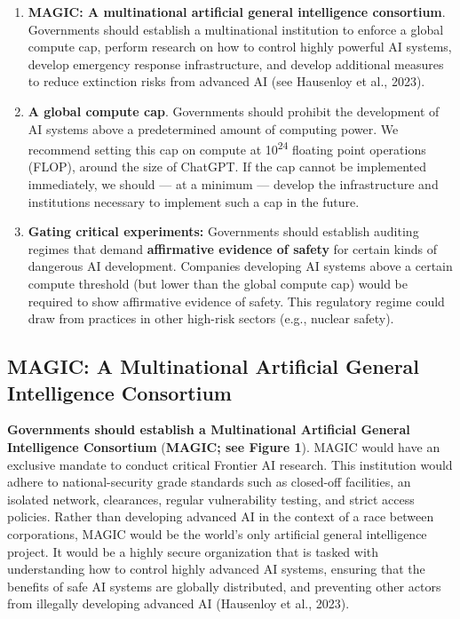 \documentclass[12pt,a4paper]{article}
\begin{document}
\begin{enumerate}
\item \textbf{MAGIC: A multinational artificial general intelligence consortium}. Governments should establish a multinational institution to enforce a global compute cap, perform research on how to control highly powerful AI systems, develop emergency response infrastructure, and develop additional measures to reduce extinction risks from advanced AI (see Hausenloy et al., 2023). 
\item \textbf{A global compute cap}. Governments should prohibit the development of AI systems above a predetermined amount of computing power. We recommend setting this cap on compute at 10\textsuperscript{24} floating point operations (FLOP), around the size of ChatGPT. If the cap cannot be implemented immediately, we should — at a minimum — develop the infrastructure and institutions necessary to implement such a cap in the future.
\item \textbf{Gating critical experiments: }Governments should establish auditing regimes that demand \textbf{affirmative evidence of safety }for certain kinds of dangerous AI development. Companies developing AI systems above a certain compute threshold (but lower than the global compute cap) would be required to show affirmative evidence of safety. This regulatory regime could draw from practices in other high-risk sectors (e.g., nuclear safety). 
\end{enumerate}

\subsection{MAGIC: A Multinational Artificial General Intelligence Consortium}

\textbf{Governments should establish a Multinational Artificial General Intelligence Consortium }(\textbf{MAGIC; see Figure 1}). MAGIC would have an exclusive mandate to conduct critical Frontier AI research. This institution would adhere to national-security grade standards such as closed-off facilities, an isolated network, clearances, regular vulnerability testing, and strict access policies. Rather than developing advanced AI in the context of a race between corporations, MAGIC would be the world’s only artificial general intelligence project. It would be a highly secure organization that is tasked with understanding how to control highly advanced AI systems, ensuring that the benefits of safe AI systems are globally distributed, and preventing other actors from illegally developing advanced AI (Hausenloy et al., 2023). 
\end{document}
